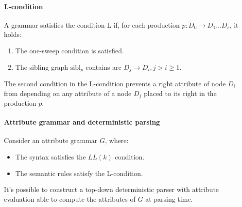\paragraph*{L-condition}
A grammar satisfies the condition L if, for each production $p: D_0 \rightarrow D_1 \ldots D_r$, it holds:
\begin{enumerate}
    \item The one-sweep condition is satisfied. 
    \item The sibling graph $\text{sibl}_p$ contains arc $D_j \rightarrow D_i, j > i \geq 1$.
\end{enumerate}
The second condition in the L-condition prevents a right attribute of node $D_i$ from depending on any attribute of a node $D_j$ placed to its right in the production $p$.

\paragraph*{Attribute grammar and deterministic parsing}
Consider an attribute grammar $G$, where:
\begin{itemize}
    \item The syntax satisfies the $LL(k)$ condition.
    \item The semantic rules satisfy the L-condition.
\end{itemize}
It's possible to construct a top-down deterministic parser with attribute evaluation able to compute the attributes of $G$ at parsing time.